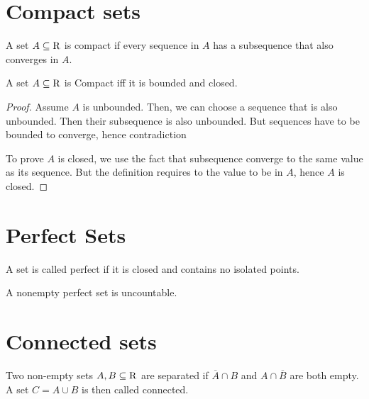 \section{Compact sets}
\begin{definition}
    A set $A \subseteq {\operatorname{R}}$ is compact if every sequence in $A$ has a subsequence that also converges in $A$.
\end{definition}
\begin{theorem}
    A set $A \subseteq {\operatorname{R}}$ is Compact iff it is bounded and closed.
    \begin{proof}
        Assume $A$ is unbounded. Then, we can choose a sequence that is also unbounded. Then their subsequence is also unbounded. But sequences have to be bounded to converge, hence contradiction

        To prove $A$ is closed, we use the fact that subsequence converge to the same value as its sequence. But the definition requires to the value to be in $A$, hence $A$ is closed.
    \end{proof}
\end{theorem}
\section{Perfect Sets}
\begin{definition}
    A set is called perfect if it is closed and contains no isolated points.
\end{definition}
\begin{theorem} A nonempty perfect set is uncountable.
\end{theorem}
\section{Connected sets}
\begin{definition}
    Two non-empty sets $A,B \subseteq {\operatorname{R}}$ are  separated if $\overline{A} \cap B$ and $A \cap \overline{B}$ are both empty. A set $C = A \cup B$ is  then called connected.
\end{definition}
